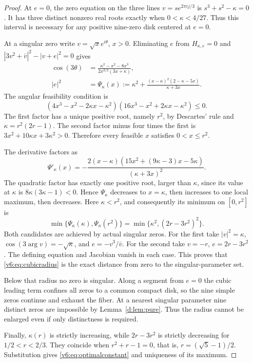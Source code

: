 \documentclass[UTF8,11pt]{ctexart}
\theoremstyle{definition}
\numberwithin{equation}{section}
\begin{document}
\begin{proof}
At $e=0$, the zero equation on the three lines
$v=s e^{2\pi i j/3}$ is $s^3+s^2-\kappa=0$.
It has three distinct nonzero real roots exactly when
$0<\kappa<4/27$. Thus this interval is necessary for any
positive nine-zero disk centered at $e=0$.

At a singular zero write $v=\sqrt{x}e^{i\theta}$, $x>0$.
Eliminating $e$ from $H_{\kappa,e}=0$ and
$|3v^2+\bar v|^2-|v+e|^2=0$ gives
\begin{align}
 \cos(3\theta)&=
 \frac{\kappa^2-x^2-8x^3}{2x^{3/2}(3x+\kappa)},
                                      \label{c:eq:cosine}\\
 |e|^2&=\Psi_\kappa(x):=\kappa^2+
 \frac{(x-\kappa)^2(2-\kappa-5x)}{\kappa+3x}.
                                      \label{c:eq:criticalmodulus}
\end{align}
The angular feasibility condition is
\begin{equation}\label{c:eq:factor}
 (4x^3-x^2-2\kappa x-\kappa^2)
 (16x^3-x^2+2\kappa x-\kappa^2)\le0.
\end{equation}
The first factor has a unique positive root, namely $r^2$,
by Descartes' rule and $\kappa=r^2(2r-1)$. The second factor
minus four times the first is
$3x^2+10\kappa x+3\kappa^2>0$. Therefore every feasible
$x$ satisfies $0<x\le r^2$.

The derivative factors as
\[
 \Psi'_\kappa(x)=
 -\frac{2(x-\kappa)
       (15x^2+(9\kappa-3)x-5\kappa)}{(\kappa+3x)^2}.
\]
The quadratic factor has exactly one positive root, larger
than $\kappa$, since its value at $\kappa$ is
$8\kappa(3\kappa-1)<0$. Hence $\Psi_\kappa$ decreases to
$x=\kappa$, then increases to one local maximum, then decreases.
Here $\kappa<r^2$, and consequently its minimum on
$[0,r^2]$ is
\[
 \min\{\Psi_\kappa(\kappa),\Psi_\kappa(r^2)\}
       =\min\{\kappa^2,(2r-3r^2)^2\}.
\]
Both candidates are achieved by actual singular zeros.
For the first take $|v|^2=\kappa$,
$\cos(3\arg v)=-\sqrt\kappa$, and $e=-v^3/\bar v$.
For the second take $v=-r$, $e=2r-3r^2$.
The defining equation and Jacobian vanish in each case.
This proves that \eqref{v6:eq:cubicradius} is the exact distance
from zero to the singular-parameter set.

Below that radius no zero is singular. Along a segment from
$e=0$ the cubic leading term confines all zeros to a common
compact disk, so the nine simple zeros continue and exhaust
the fiber. At a nearest singular parameter nine distinct zeros
are impossible by Lemma~\ref{d:lem:pure}. Thus the radius cannot
be enlarged even if only distinctness is required.

Finally, $\kappa(r)$ is strictly increasing, while
$2r-3r^2$ is strictly decreasing for $1/2<r<2/3$.
They coincide when $r^2+r-1=0$, that is,
$r=(\sqrt5-1)/2$. Substitution gives
\eqref{v6:eq:optimalconstant} and uniqueness of its maximum.
\end{proof}
\end{document}

